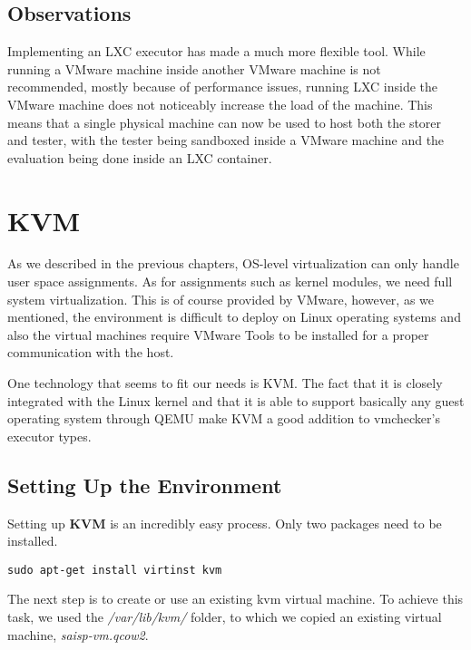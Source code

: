 \subsection{Observations}
\label{sec:vmc-lxc-comments}

Implementing an LXC executor has made \project a much more flexible tool.
While running a VMware machine inside another VMware machine is not recommended,
mostly because of performance issues, running LXC inside the VMware machine
does not noticeably increase the load of the machine. This means that a single
physical machine can now be used to host both the storer and tester, with the
tester being sandboxed inside a VMware machine and the evaluation being done
inside an LXC container.

\section{KVM}
\label{sec:vmc-kvm}

As we described in the previous chapters, OS-level virtualization can only
handle user space assignments. As for assignments such as kernel modules,
we need full system virtualization. This is of course provided by VMware,
however, as we mentioned, the environment is difficult to deploy on 
Linux operating systems and also the virtual machines require VMware Tools
to be installed for a proper communication with the host.

One technology that seems to fit our needs is KVM. The fact that it is closely
integrated with the Linux kernel and that it is able to support basically
any guest operating system through QEMU make KVM a good addition to vmchecker's 
executor types.

\subsection{Setting Up the Environment}
\label{sub-sec:vmc-kvm-setup}

Setting up \textbf{KVM} is an incredibly easy process. Only two packages need
to be installed.

\lstset{caption=Install the Needed Packages, label=lst:kvm-deps}
\begin{lstlisting}
sudo apt-get install virtinst kvm
\end{lstlisting}

The next step is to create or use an existing kvm virtual machine.
To achieve this task, we used the \textit{/var/lib/kvm/} folder, to which
we copied an existing virtual machine, \textit{saisp-vm.qcow2}.

